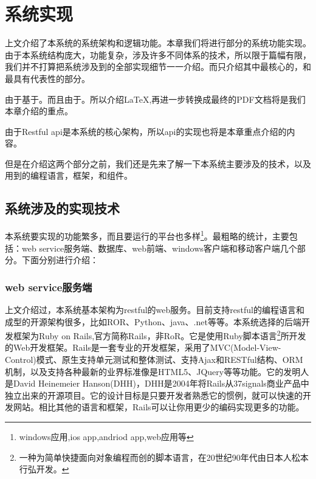 
\chapter{系统实现}
\label{chap:achieve}

上文介绍了本系统的系统架构和逻辑功能。本章我们将进行部分的系统功能实现。由于本系统结构庞大，功能复杂，涉及许多不同体系的技术，所以限于篇幅有限，我们并不打算把系统涉及到的全部实现细节一一介绍。而只介绍其中最核心的，和最具有代表性的部分。

由于基于。而且由于。所以介绍\LaTeX,再进一步转换成最终的PDF文档将是我们本章介绍的重点。

由于Restful api\cite{richardson2008restful,allamaraju2010restful,fielding2000architectural,pautasso2008restful,story2009foaf}是本系统的核心架构，所以api的实现也将是本章重点介绍的内容。

但是在介绍这两个部分之前，我们还是先来了解一下本系统主要涉及的技术，以及用到的编程语言，框架，和组件。

\section{系统涉及的实现技术}
\label{sec:language}

本系统要实现的功能繁多，而且要运行的平台也多样\footnote{windows应用,ios app,andriod app,web应用等}。最粗略的统计，主要包括：web service服务端、数据库、web前端、windows客户端和移动客户端几个部分。下面分别进行介绍：

\subsection{web service服务端}
\label{sec:webservice}

上文介绍过，本系统基本架构为restful的web服务。目前支持restful的编程语言和成型的开源架构很多，比如ROR、Python、java、.net等等。本系统选择的后端开发框架为Ruby on Rails,官方简称Rails\cite{ruby2009agile,hartl2012ruby}，非RoR。它是使用Ruby\cite{thomas2004programming}脚本语言\footnote{一种为简单快捷面向对象编程而创的脚本语言，在20世纪90年代由日本人松本行弘开发。}所开发的Web开发框架。Rails是一套专业的开发框架，采用了MVC(Model-View-Control)模式、原生支持单元测试和整体测试、支持Ajax和RESTful结构、ORM机制，以及支持各种最新的业界标准像是HTML5、JQuery等等功能。它的发明人是David Heinemeier Hanson(DHH)，DHH是2004年将Rails从37signals商业产品中独立出来的开源项目。它的设计目标是只要开发者熟悉它的惯例，就可以快速的开发网站。相比其他的语言和框架，Rails可以让你用更少的编码实现更多的功能。


